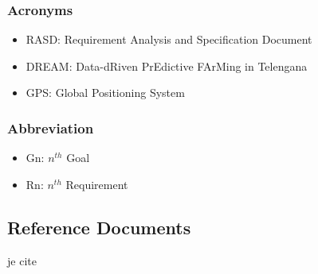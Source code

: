\subsubsection{Acronyms}
\begin{itemize}
	\item RASD: Requirement Analysis and Specification Document
	\item DREAM: Data-dRiven PrEdictive FArMing in
Telengana
	\item GPS: Global Positioning System
\end{itemize}

\subsubsection{Abbreviation}
\begin{itemize}
	\item Gn: $n^{th}$ Goal
	\item Rn: $n^{th}$ Requirement
\end{itemize}

\subsection{Reference Documents}
je cite \cite{seeds}